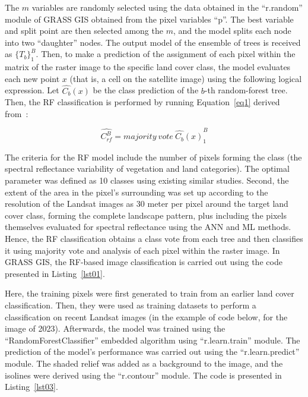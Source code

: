 \documentclass[jmse,article,accept,pdftex,oneauthor]{Definitions/mdpi}
\begin{document}
The $m$ variables are randomly selected  using the data obtained in the ``r.random'' module of GRASS GIS obtained from the pixel variables ``p''. The best variable and split point are then selected among the $m$, and the model splits each node into two ``daughter'' nodes. The output model of the ensemble of trees is received as $\{T_b\}_1^B$. Then, to make a prediction of the assignment of each pixel within the matrix of the raster image to the specific land cover class, the model evaluates each new point $x$ (that is, a cell on the satellite image) using the following logical expression. Let $\hat{C_b}(x)$ be the class prediction of the $b$-th random-forest tree. Then, the RF classification is performed by running   Equation~\eqref{eq1} derived from~\cite{709601}:

\begin{equation}
\hat{C^B_{rf}} = majority \:  vote \:  {\hat{C_b}(x)}_1^B
\label{eq1}
\end{equation}

The criteria for the RF model include the number of pixels forming the class (the spectral reflectance variability of vegetation and land categories). The optimal parameter was defined as 10 classes using   existing similar studies. Second, the extent of the area in the pixel's surrounding was set up according to the resolution of the Landsat images as 30 meter per pixel around the target land cover class, forming the complete landscape pattern, plus including the pixels themselves evaluated for spectral reflectance using the ANN and ML methods. Hence, the RF classification obtains a class vote from each tree  and then classifies it using majority vote and analysis of each pixel within the raster image. In GRASS GIS, the RF-based image classification is carried out using the   code presented in Listing~\ref{lst01}. 

Here, the  training pixels were first generated to train from an earlier land cover classification. Then, they were used as training datasets to perform a classification on recent Landsat images (in the example of code below, for the image of 2023). Afterwards, the model was trained using the  ``RandomForestClassifier'' embedded algorithm using ``r.learn.train'' module. The prediction of the model's performance was carried out  using the ``r.learn.predict'' module. The shaded relief was added as a background to the image, and the isolines were derived using the ``r.contour'' module. The code is presented in Listing~\ref{lst03}.
\end{document}
